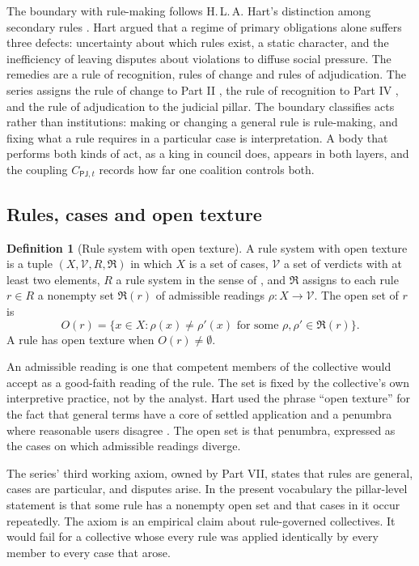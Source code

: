 \documentclass[11pt,letterpaper]{article}
\theoremstyle{definition}
\newtheorem{definition}[theorem]{Definition}
\theoremstyle{remark}
\newcommand{\pP}{\mathsf{P}}
\newcommand{\pJ}{\mathsf{J}}
\newcommand{\Read}{\mathfrak{R}}
\begin{document}
The boundary with rule-making follows H.\,L.\,A. Hart's distinction among secondary rules \citep{hart1961}. Hart argued that a regime of primary obligations alone suffers three defects: uncertainty about which rules exist, a static character, and the inefficiency of leaving disputes about violations to diffuse social pressure. The remedies are a rule of recognition, rules of change and rules of adjudication. The series assigns the rule of change to Part II \citep{long2026political}, the rule of recognition to Part IV \citep{long2026ideological}, and the rule of adjudication to the judicial pillar. The boundary classifies acts rather than institutions: making or changing a general rule is rule-making, and fixing what a rule requires in a particular case is interpretation. A body that performs both kinds of act, as a king in council does, appears in both layers, and the coupling $C_{\pP\pJ,t}$ records how far one coalition controls both.

\subsection{Rules, cases and open texture}

\begin{definition}[Rule system with open texture]
\label{def:judicial-power:open-texture}
A rule system with open texture is a tuple $(X,\mathcal{V},R,\Read)$ in which $X$ is a set of cases, $\mathcal{V}$ a set of verdicts with at least two elements, $R$ a rule system in the sense of \citet[Definition~2.1]{long2026political}, and $\Read$ assigns to each rule $r\in R$ a nonempty set $\Read(r)$ of admissible readings $\rho:X\to\mathcal{V}$. The open set of $r$ is
\[
O(r)=\{x\in X : \rho(x)\neq\rho'(x)\text{ for some }\rho,\rho'\in\Read(r)\}.
\]
A rule has open texture when $O(r)\neq\emptyset$.
\end{definition}

An admissible reading is one that competent members of the collective would accept as a good-faith reading of the rule. The set is fixed by the collective's own interpretive practice, not by the analyst. Hart used the phrase ``open texture'' for the fact that general terms have a core of settled application and a penumbra where reasonable users disagree \citep{hart1961}. The open set is that penumbra, expressed as the cases on which admissible readings diverge.

The series' third working axiom, owned by Part VII, states that rules are general, cases are particular, and disputes arise. In the present vocabulary the pillar-level statement is that some rule has a nonempty open set and that cases in it occur repeatedly. The axiom is an empirical claim about rule-governed collectives. It would fail for a collective whose every rule was applied identically by every member to every case that arose.
\end{document}
